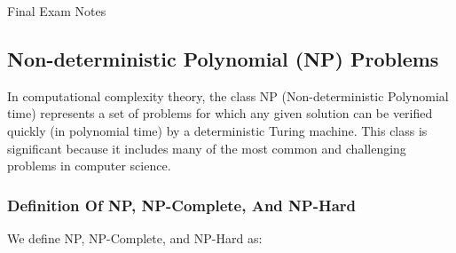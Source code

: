 \begin{examnotes}{Final Exam Notes}
    \subsection*{Non-deterministic Polynomial (NP) Problems}

    In computational complexity theory, the class NP (Non-deterministic Polynomial time) represents a set of problems for which any given solution can be verified quickly (in polynomial time) by a 
    deterministic Turing machine. This class is significant because it includes many of the most common and challenging problems in computer science.

    \subsubsection*{Definition Of NP, NP-Complete, And NP-Hard}

    We define NP, NP-Complete, and NP-Hard as:


\end{examnotes}
